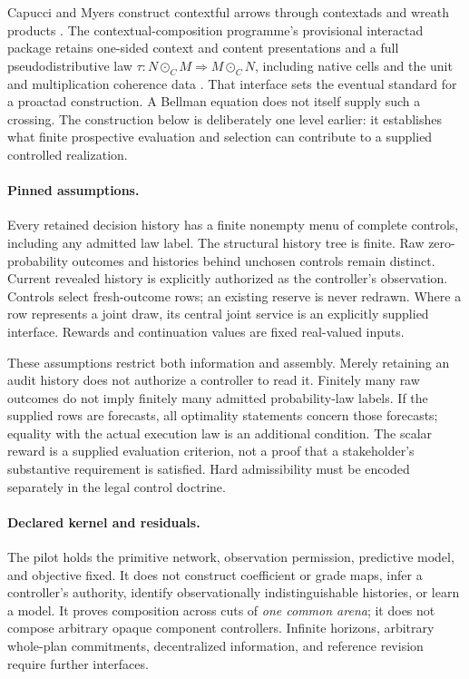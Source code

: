 \documentclass[11pt]{article}
\theoremstyle{definition}
\begin{document}
Capucci and Myers construct contextful arrows through contextads and wreath
products \cite{contextads}. The contextual-composition programme's
provisional interactad package retains
one-sided context and content presentations and a full pseudodistributive law
\(\tau:N\odot_C M\Rightarrow M\odot_C N\), including native cells and the unit
and multiplication coherence data \cite{terminology,relative}. That interface
sets the eventual standard for a proactad construction. A Bellman equation
does not itself supply such a crossing. The construction below is deliberately
one level earlier: it establishes what finite prospective evaluation and
selection can contribute to a supplied controlled realization.

\paragraph{Pinned assumptions.}
Every retained decision history has a finite nonempty menu of complete
controls, including any admitted law label. The structural history tree is
finite. Raw zero-probability outcomes and histories behind unchosen controls
remain distinct. Current revealed history is explicitly authorized as the
controller's observation. Controls select fresh-outcome rows; an existing
reserve is never redrawn. Where a row represents a joint draw, its central
joint service is an explicitly supplied interface. Rewards and continuation
values are fixed real-valued inputs.

These assumptions restrict both information and assembly. Merely retaining
an audit history does not authorize a controller to read it. Finitely many
raw outcomes do not imply finitely many admitted probability-law labels.
If the supplied rows are forecasts, all optimality statements concern those
forecasts; equality with the actual execution law is an additional condition.
The scalar reward is a supplied evaluation criterion, not a proof that a
stakeholder's substantive requirement is satisfied. Hard admissibility must
be encoded separately in the legal control doctrine.

\paragraph{Declared kernel and residuals.}
The pilot holds the primitive network, observation permission, predictive
model, and objective fixed. It does not construct coefficient or grade maps,
infer a controller's authority, identify observationally indistinguishable
histories, or learn a model. It proves composition across cuts of \emph{one
common arena}; it does not compose arbitrary opaque component controllers.
Infinite horizons, arbitrary whole-plan commitments, decentralized
information, and reference revision require further interfaces.
\end{document}
